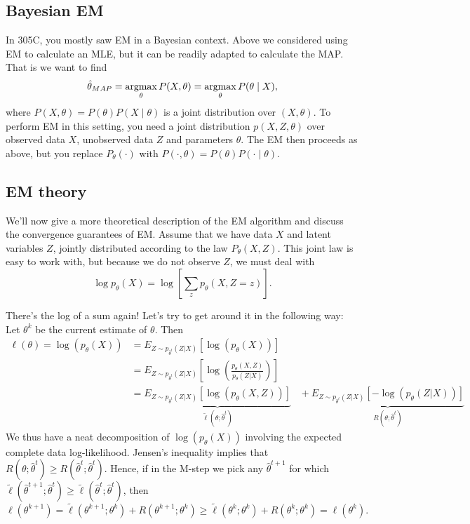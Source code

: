 \subsection{Bayesian EM}

In 305C, you mostly saw EM in a Bayesian context. Above we considered using EM to calculate an MLE, but it can be readily adapted to calculate the MAP. That is we want to find
\[\hat{\theta}_{MAP} = \operatorname*{argmax}_\theta P(X,\theta) =\operatorname*{argmax}_\theta P(\theta \mid X), \]
where $P(X,\theta) = P(\theta)P(X\mid \theta)$ is a joint distribution over $(X,\theta)$. To perform EM in this setting, you need a joint distribution $p(X,Z,\theta)$ over observed data $X$, unobserved data $Z$ and parameters $\theta$. The EM then proceeds as above, but you replace $P_\theta(\cdot)$ with $P(\cdot , \theta)= P(\theta)P(\cdot \mid \theta)$. 


\subsection{EM theory}

We'll now give a more theoretical description of the EM algorithm and discuss the convergence guarantees of EM. Assume that we have data $X$ and latent variables $Z$, jointly distributed according to the law $P_\theta (X, Z)$. This joint law is easy to work with, but because we do not observe $Z$, we must deal with
\[ \log p_\theta(X) = \log \left[ \sum_z p_\theta (X, Z = z) \right]. \]

There's the log of a sum again! Let's try to get around it in the following way: Let $\theta^k$ be the current estimate of $\theta$. Then
\begin{align*}
\ell(\theta) = \log(p_\theta(X)) &= E_{Z \sim p_{\hat{\theta}^t}(Z | X)}\left[\log(p_\theta(X)) \right] \\
       &= E_{Z \sim p_{\hat{\theta}^t}(Z | X)}\left[\log\left(\frac{p_\theta(X, Z)}{p_\theta(Z | X)} \right) \right] \\
       &= \underbrace{E_{Z \sim p_{\hat{\theta}^t}(Z | X)}\left[\log\left(p_\theta(X, Z)\right)\right]}_{\tilde{\ell}(\theta ; \hat{\theta}^t)} \;\;\; 
       + \underbrace{ E_{Z \sim p_{\hat{\theta}^t}(Z | X)}\left[-\log\left(p_\theta(Z | X)\right) \right]}_{R(\theta; \hat{\theta}^t)} 
\end{align*} 
We thus have a neat decomposition of $\log(p_\theta(X))$ involving the expected complete data log-likelihood. Jensen's inequality implies that $R(\theta; \hat{\theta}^t) \geq R(\hat{\theta}^t;\hat{\theta}^t)$. Hence, if in the M-step we pick any $\hat{\theta}^{t+1}$ for which $ \tilde{\ell}(\hat{\theta}^{t+1};\hat{\theta}^t) \geq \tilde{\ell}(\hat{\theta}^t; \hat{\theta}^t) $, then
\begin{equation*}
\ell(\theta^{k+1})  = \tilde{\ell}(\theta^{k+1} ; \theta^k) + R(\theta^{k+1}; \theta^k) \geq \tilde{\ell}(\theta^k ; \theta^k) +R(\theta^{k}; \theta^k) =\ell(\theta^{k}).
\end{equation*}

